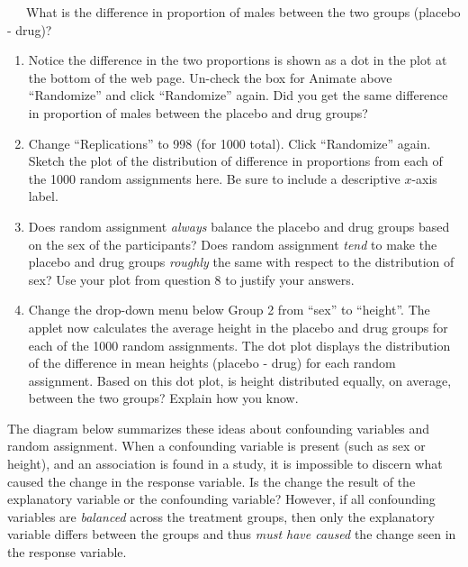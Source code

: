 \documentclass[
]{report}
\begin{document}
~~~What is the difference in proportion of males between the two groups (placebo - drug)?

\vspace{0.1in}

\begin{enumerate}
\def\labelenumi{\arabic{enumi}.}
\setcounter{enumi}{6}
\item
  Notice the difference in the two proportions is shown as a dot in the plot at the bottom of the web page. Un-check the box for Animate above ``Randomize'' and click ``Randomize'' again. Did you get the same difference in proportion of males between the placebo and drug groups?
  \vspace{0.25in}
\item
  Change ``Replications'' to 998 (for 1000 total). Click ``Randomize'' again. Sketch the plot of the distribution of difference in proportions from each of the 1000 random assignments here. Be sure to include a descriptive \(x\)-axis label.
  \vspace{1.25in}
\item
  Does random assignment \emph{always} balance the placebo and drug groups based on the sex of the participants? Does random assignment \emph{tend} to make the placebo and drug groups \emph{roughly} the same with respect to the distribution of sex? Use your plot from question 8 to justify your answers.
  \vspace{0.5in}
\item
  Change the drop-down menu below Group 2 from ``sex'' to ``height''. The applet now calculates the average height in the placebo and drug groups for each of the 1000 random assignments. The dot plot displays the distribution of the difference in mean heights (placebo - drug) for each random assignment. Based on this dot plot, is height distributed equally, on average, between the two groups? Explain how you know.
  \vspace{0.5in}
\end{enumerate}

\newpage

The diagram below summarizes these ideas about confounding variables and random assignment. When a confounding variable is present (such as sex or height), and an association is found in a study, it is impossible to discern what caused the change in the response variable. Is the change the result of the explanatory variable or the confounding variable? However, if all confounding variables are \emph{balanced} across the treatment groups, then only the explanatory variable differs between the groups and thus \emph{must have caused} the change seen in the response variable.
\end{document}
